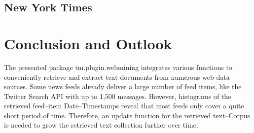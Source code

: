 \documentclass[a4paper]{article}
\newcommand{\class}[1]{\mbox{\textsf{#1}}}
\newcommand{\pkg}[1]{{\normalfont\fontseries{b}\selectfont #1}}
\begin{document}
\subsection{New York Times}


\section{Conclusion and Outlook}
The presented package \pkg{tm.plugin.webmining} integrates various functions to conveniently
retrieve and extract text documents from numerous web data sources. Some news feeds
already deliver a large number of feed items, like the Twitter Search API with up to 1,500 messages.
However, histograms of the retrieved feed--item Date--Timestamps reveal that most feeds
only cover a quite short period of time. Therefore, an update function for the retrieved
text--\class{Corpus} is needed to grow the retrieved text collection further over time.


%
%


\end{document}
